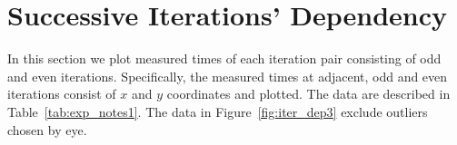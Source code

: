\documentclass[10pt]{article}
\begin{document}
\clearpage
\newpage

\section{Successive Iterations' Dependency}
In this section we plot measured times of each iteration pair consisting of odd and even iterations.
Specifically, the measured times at adjacent, odd and even iterations consist of $x$ and $y$ coordinates and plotted.
The data are described in Table~\ref{tab:exp_notes1}. 
The data in Figure~\ref{fig:iter_dep3} exclude outliers chosen by eye.
\end{document}
